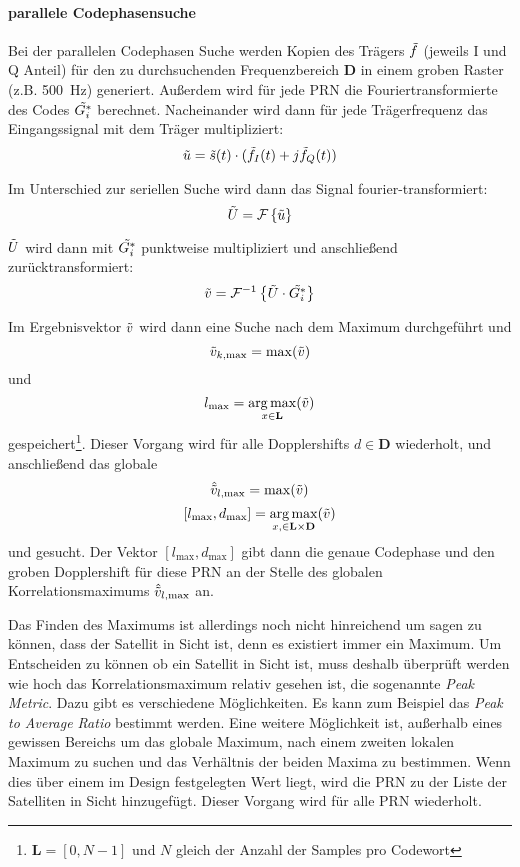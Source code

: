 \paragraph{parallele Codephasensuche}
Bei der parallelen Codephasen Suche werden Kopien des Trägers $\tilde{f}$ (jeweils I und Q Anteil) für den zu durchsuchenden Frequenzbereich $\textbf{D}$ in einem groben Raster (z.B. \SI{500}{\Hz}) generiert. Außerdem wird für jede PRN die Fouriertransformierte des Codes $\tilde{G_i^*}$ berechnet. Nacheinander wird dann für jede Trägerfrequenz das Eingangssignal mit dem Träger multipliziert:
\begin{equation}
	\tilde{u}=\tilde{s}(t) \cdot (\tilde{f}_I(t) + j \tilde{f}_Q(t))
\end{equation}

Im Unterschied zur seriellen Suche wird dann das Signal  fourier-transformiert:
\begin{equation}
	\tilde{U}=\mathcal{F}\left\{\tilde{u}\right\}
\end{equation}

$\tilde{U}$ wird dann mit $\tilde{G_i^*}$ punktweise multipliziert und anschließend zurücktransformiert: 
\begin{equation}
	\tilde{v}=\mathcal{F}^{-1}\left\{\tilde{U} \cdot \tilde{G_i^*}\right\}
\end{equation}

Im Ergebnisvektor $\tilde{v}$ wird dann eine Suche nach dem Maximum durchgeführt und 
\begin{equation}
	\tilde{v}_{k,\max}=\max(\tilde{v})
\end{equation}
und
\begin{equation}
     l_{\max}=\operatorname*{arg\,max}_{x\in \textbf{L}}(\tilde{v})
\end{equation} 
gespeichert\footnote{$\textbf{L}=[0, N-1]$ und $N$ gleich der Anzahl der Samples pro Codewort}. Dieser Vorgang wird für alle Dopplershifts $d\in \textbf{D}$ wiederholt, und anschließend das globale 
\begin{equation}
	\hat{\tilde{v}}_{l,\max}=\max(\tilde{v})
\end{equation}
\begin{equation}
	\left[l_{\max}, d_{\max}\right]=\operatorname*{arg\,max}_{x,\in \bf{L} \times \bf{D}}(\tilde{v})
\end{equation}
und gesucht. Der Vektor $\left[l_{\max}, d_{\max}\right]$ gibt dann die genaue Codephase und den groben Dopplershift für diese PRN an der Stelle des globalen Korrelationsmaximums $\hat{\tilde{v}}_{l,\max}$ an. 

Das Finden des Maximums ist allerdings noch nicht hinreichend um sagen zu können, dass der Satellit in Sicht ist, denn es existiert immer ein Maximum. Um Entscheiden zu können ob ein Satellit in Sicht ist, muss deshalb überprüft werden wie hoch das Korrelationsmaximum relativ gesehen ist, die sogenannte \emph{Peak Metric}. Dazu gibt es verschiedene Möglichkeiten. Es kann zum Beispiel das \emph{Peak to Average Ratio} bestimmt werden. Eine weitere Möglichkeit ist, außerhalb eines gewissen Bereichs um das globale Maximum, nach einem zweiten lokalen Maximum zu suchen und das Verhältnis der beiden Maxima zu bestimmen.
Wenn dies über einem im Design festgelegten Wert liegt, wird die PRN zu der Liste der Satelliten in Sicht hinzugefügt. Dieser Vorgang wird für alle PRN wiederholt. 

